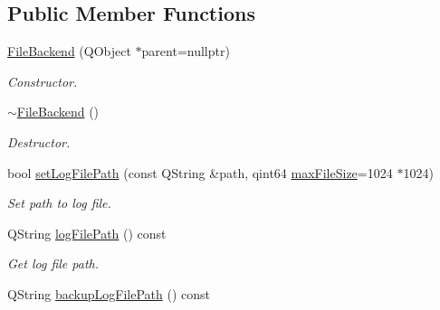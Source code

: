 \subsection*{Public Member Functions}
\begin{DoxyCompactItemize}
\item 
\hyperlink{class_mdt_1_1_error_logger_1_1_file_backend_aac1230ca01a0aeb93731121ee4feaa3a}{File\+Backend} (Q\+Object $\ast$parent=nullptr)\hypertarget{class_mdt_1_1_error_logger_1_1_file_backend_aac1230ca01a0aeb93731121ee4feaa3a}{}\label{class_mdt_1_1_error_logger_1_1_file_backend_aac1230ca01a0aeb93731121ee4feaa3a}

\begin{DoxyCompactList}\small\item\em Constructor. \end{DoxyCompactList}\item 
\hyperlink{class_mdt_1_1_error_logger_1_1_file_backend_a5f7262e481d756d7145bbfa42aeca91e}{$\sim$\+File\+Backend} ()\hypertarget{class_mdt_1_1_error_logger_1_1_file_backend_a5f7262e481d756d7145bbfa42aeca91e}{}\label{class_mdt_1_1_error_logger_1_1_file_backend_a5f7262e481d756d7145bbfa42aeca91e}

\begin{DoxyCompactList}\small\item\em Destructor. \end{DoxyCompactList}\item 
bool \hyperlink{class_mdt_1_1_error_logger_1_1_file_backend_a844fc6f89a147b0713700028808e364a}{set\+Log\+File\+Path} (const Q\+String \&path, qint64 \hyperlink{class_mdt_1_1_error_logger_1_1_file_backend_a8c5943cdd59ed5941c72490d7b414359}{max\+File\+Size}=1024 $\ast$1024)
\begin{DoxyCompactList}\small\item\em Set path to log file. \end{DoxyCompactList}\item 
Q\+String \hyperlink{class_mdt_1_1_error_logger_1_1_file_backend_ac25cd41dbbe940bf0247e5054ce8805e}{log\+File\+Path} () const \hypertarget{class_mdt_1_1_error_logger_1_1_file_backend_ac25cd41dbbe940bf0247e5054ce8805e}{}\label{class_mdt_1_1_error_logger_1_1_file_backend_ac25cd41dbbe940bf0247e5054ce8805e}

\begin{DoxyCompactList}\small\item\em Get log file path. \end{DoxyCompactList}\item 
Q\+String \hyperlink{class_mdt_1_1_error_logger_1_1_file_backend_a7c79c940be2f03f22111638d2e749a64}{backup\+Log\+File\+Path} () const \hypertarget{class_mdt_1_1_error_logger_1_1_file_backend_a7c79c940be2f03f22111638d2e749a64}{}\label{class_mdt_1_1_error_logger_1_1_file_backend_a7c79c940be2f03f22111638d2e749a64}


\end{DoxyCompactItemize}

